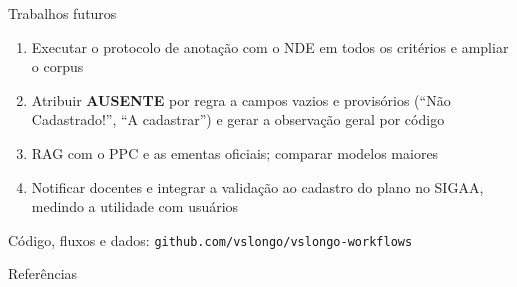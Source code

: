 \documentclass[aspectratio=169,11pt,xcolor=table]{beamer}
\newcommand{\aus}{{\bfseries\color{ifcvermelho}AUSENTE}}
\begin{document}
\begin{frame}{Trabalhos futuros}
  \begin{enumerate}\setlength\itemsep{0.8em}
    \item Executar o protocolo de anotação com o NDE em todos os critérios e ampliar o corpus
    \item Atribuir \aus{} por regra a campos vazios e provisórios (``Não Cadastrado!'',
          ``A cadastrar'') e gerar a observação geral por código
    \item RAG com o PPC e as ementas oficiais; comparar modelos maiores
    \item Notificar docentes e integrar a validação ao cadastro do plano no SIGAA,
          medindo a utilidade com usuários
  \end{enumerate}
  \vfill
  {\small\color{ifccinza} Código, fluxos e dados: \texttt{github.com/vslongo/vslongo-workflows}}
\end{frame}

\begin{frame}[allowframebreaks]{Referências}
  \printbibliography[heading=none]
\end{frame}

\end{document}
